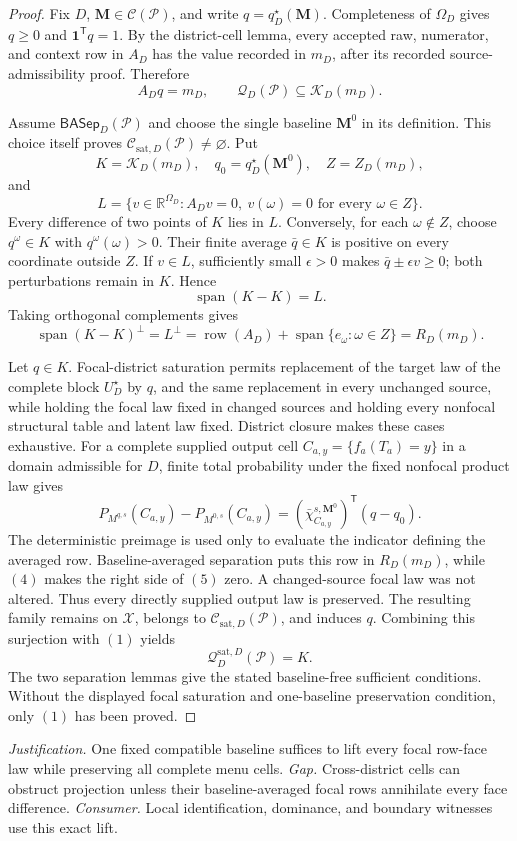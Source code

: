 \documentclass{article}
\begin{document}
\begin{proof}
Fix \(D\), \(\mathbf M\in\mathcal C(\mathcal P)\), and write \(q=q_D^\star(\mathbf M)\).  Completeness of \(\Omega_D\) gives \(q\geq0\) and \(\mathbf 1^{\mathsf T}q=1\).  By the district-cell lemma, every accepted raw, numerator, and context row in \(A_D\) has the value recorded in \(m_D\), after its recorded source-admissibility proof.  Therefore
\[
A_Dq=m_D,
\qquad
\mathcal Q_D(\mathcal P)\subseteq\mathcal K_D(m_D).
\tag{1}
\]

Assume \(\mathsf{BASep}_D(\mathcal P)\) and choose the single baseline \(\mathbf M^0\) in its definition.  This choice itself proves \(\mathcal C_{\mathrm{sat},D}(\mathcal P)\ne\varnothing\).  Put
\[
K=\mathcal K_D(m_D),\quad q_0=q_D^\star(\mathbf M^0),\quad Z=Z_D(m_D),
\]
and
\[
L=\{v\in\mathbb R^{\Omega_D}:A_Dv=0,
\ v(\omega)=0\text{ for every }\omega\in Z\}.
\tag{2}
\]
Every difference of two points of \(K\) lies in \(L\).  Conversely, for each \(\omega\notin Z\), choose \(q^\omega\in K\) with \(q^\omega(\omega)>0\).  Their finite average \(\bar q\in K\) is positive on every coordinate outside \(Z\).  If \(v\in L\), sufficiently small \(\epsilon>0\) makes \(\bar q\pm\epsilon v\geq0\); both perturbations remain in \(K\).  Hence
\[
\operatorname{span}(K-K)=L.
\tag{3}
\]
Taking orthogonal complements gives
\[
\operatorname{span}(K-K)^\perp
=L^\perp
=\operatorname{row}(A_D)+
\operatorname{span}\{e_\omega:\omega\in Z\}
=R_D(m_D).
\tag{4}
\]

Let \(q\in K\).  Focal-district saturation permits replacement of the target law of the complete block \(U_D^\star\) by \(q\), and the same replacement in every unchanged source, while holding the focal law fixed in changed sources and holding every nonfocal structural table and latent law fixed.  District closure makes these cases exhaustive.  For a complete supplied output cell \(C_{a,y}=\{f_a(T_a)=y\}\) in a domain admissible for \(D\), finite total probability under the fixed nonfocal product law gives
\[
P_{M^{q,s}}(C_{a,y})-P_{M^{0,s}}(C_{a,y})
=(\bar\chi_{C_{a,y}}^{s,\mathbf M^0})^{\mathsf T}(q-q_0).
\tag{5}
\]
The deterministic preimage is used only to evaluate the indicator defining the averaged row.  Baseline-averaged separation puts this row in \(R_D(m_D)\), while \((4)\) makes the right side of \((5)\) zero.  A changed-source focal law was not altered.  Thus every directly supplied output law is preserved.  The resulting family remains on \(\mathcal X\), belongs to \(\mathcal C_{\mathrm{sat},D}(\mathcal P)\), and induces \(q\).  Combining this surjection with \((1)\) yields
\[
\mathcal Q_D^{\mathrm{sat},D}(\mathcal P)=K.
\]
The two separation lemmas give the stated baseline-free sufficient conditions.  Without the displayed focal saturation and one-baseline preservation condition, only \((1)\) has been proved.
\end{proof}
\par\smallskip\noindent \textit{Justification.} One fixed compatible baseline suffices to lift every focal row-face law while preserving all complete menu cells. \textit{Gap.} Cross-district cells can obstruct projection unless their baseline-averaged focal rows annihilate every face difference. \textit{Consumer.} Local identification, dominance, and boundary witnesses use this exact lift.
\end{document}
